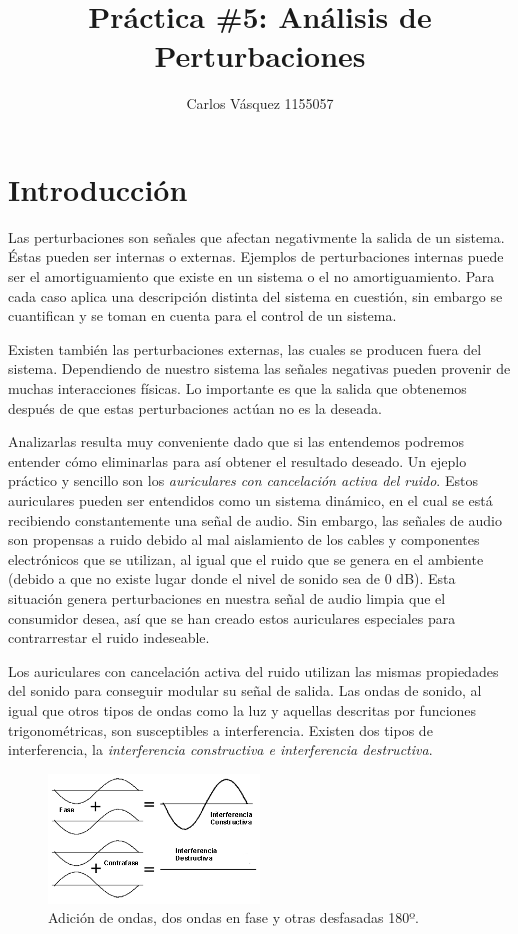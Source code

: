 \documentclass[12pt, letterpaper]{article}
\title{Práctica \#5: Análisis de Perturbaciones}
\author{Carlos Vásquez 1155057}
\begin{document}
\maketitle
\section*{Introducción}

Las perturbaciones son señales que afectan negativmente la salida de un sistema. Éstas pueden ser internas o externas. Ejemplos de perturbaciones internas puede ser el amortiguamiento que existe en un sistema o el no amortiguamiento. Para cada caso aplica una descripción distinta del sistema en cuestión, sin embargo se cuantifican y se toman en cuenta para el control de un sistema.

Existen también las perturbaciones externas, las cuales se producen fuera del sistema. Dependiendo de nuestro sistema las señales negativas pueden provenir de muchas interacciones físicas. Lo importante es que la salida que obtenemos después de que estas perturbaciones actúan no es la deseada.

Analizarlas resulta muy conveniente dado que si las entendemos podremos entender cómo eliminarlas para así obtener el resultado deseado. Un ejeplo práctico y sencillo son los \textit{auriculares con cancelación activa del ruido}. Estos auriculares pueden ser entendidos como un sistema dinámico, en el cual se está recibiendo constantemente una señal de audio. Sin embargo, las señales de audio son propensas a ruido debido al mal aislamiento de los cables y componentes electrónicos que se utilizan, al igual que el ruido que se genera en el ambiente (debido a que no existe lugar donde el nivel de sonido sea de 0 dB). Esta situación genera perturbaciones en nuestra señal de audio limpia que el consumidor desea, así que se han creado estos auriculares especiales para contrarrestar el ruido indeseable.

Los auriculares con cancelación activa del ruido utilizan las mismas propiedades del sonido para conseguir modular su señal de salida. Las ondas de sonido, al igual que otros tipos de ondas como la luz y aquellas descritas por funciones trigonométricas, son susceptibles a interferencia. Existen dos tipos de interferencia, la \textit{interferencia constructiva e interferencia destructiva}. 

\begin{figure}[H]
	\centering
	\includegraphics[width = 0.5\textwidth]{interferance.png}
	\caption{Adición de ondas, dos ondas en fase y otras desfasadas 180º.}
\end{figure}
\end{document}
